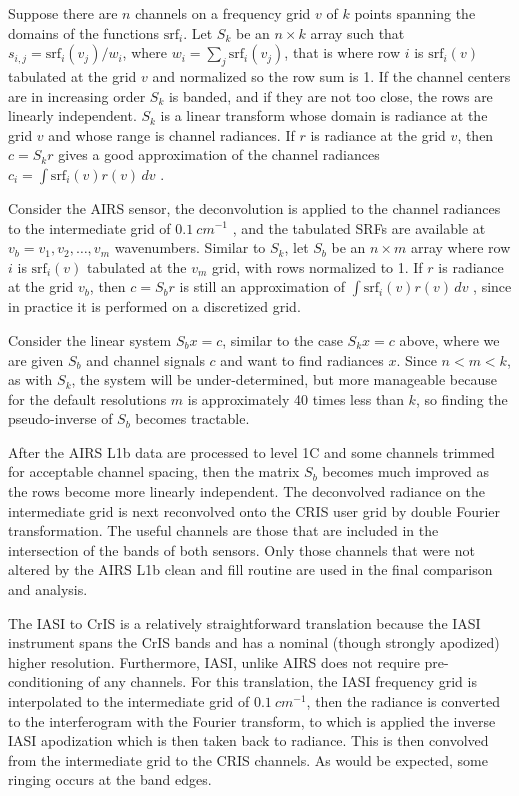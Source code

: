 \documentclass[twocolumn,10pt]{article}
\begin{document}
Suppose there are $n$ channels on a frequency grid $v$ of $k$ points spanning the domains of the functions $\text{srf}_i$. Let $S_k$ be an $n\times k$ array such that $s_{i,j} = \text{srf}_i(v_j)/w_i$, where $w_i = \sum_j \text{srf}_i(v_j)$, that is where row $i$ is $\text{srf}_i(v)$ tabulated at the grid $v$ and normalized so the row sum is 1.  If the channel centers are in increasing order $S_k$ is banded, and if they are not too close,  the rows are linearly independent.  $S_k$ is a linear transform whose domain is radiance at the grid $v$ and whose range is channel radiances.  If $r$ is radiance at the grid $v$, then $c = S_k r$ gives a good approximation of the channel radiances $c_i = \int \text{srf}_i(v)r(v)\,dv$ .

Consider the AIRS sensor, the deconvolution is applied to the channel radiances to the intermediate grid of $0.1\ cm^{-1}$ , and the tabulated SRFs are available at $v_b = v_1,v_2,\ldots,v_m$ wavenumbers.  Similar to $S_k$, let $S_b$ be an $n\times m$ array where row $i$ is $\text{srf}_i(v)$ tabulated at the $v_m$ grid, with rows normalized to 1. If $r$ is radiance at the grid $v_b$, then $c = S_b r$ is still an approximation of $\int \text{srf}_i(v)r(v)\,dv$ , since in practice it is performed on a discretized grid.

Consider the linear system $S_b x = c$, similar to the case $S_k x = c$ above, where we are given $S_b$ and channel signals $c$ and want to find radiances $x$.  Since $n < m < k$, as with $S_k$, the system will be under-determined, but more manageable because for the default resolutions $m$ is approximately 40 times less than $k$, so finding the pseudo-inverse of $S_b$ becomes tractable.

After the AIRS L1b data are processed to level 1C and some channels trimmed for acceptable channel spacing, then the matrix $S_b$ becomes much improved as the rows become more linearly independent. The deconvolved radiance on the intermediate grid is next reconvolved onto the CRIS user grid by double Fourier transformation. The useful channels are those that are included in the intersection of the bands of both sensors.  Only those channels that were not altered by the AIRS L1b clean and fill routine are used in the final comparison and analysis.

The IASI to CrIS is a relatively straightforward translation because the IASI instrument spans the CrIS bands and has a nominal (though strongly apodized) higher resolution. Furthermore, IASI, unlike AIRS does not require pre-conditioning of any channels. For this translation, the IASI frequency grid is interpolated to the intermediate grid of $0.1\ cm^{-1}$, then the radiance is converted to the interferogram with the Fourier transform, to which is applied the inverse IASI apodization which is then taken back to radiance. This is then convolved from the intermediate grid to the CRIS channels. As would be expected, some ringing occurs at the band edges.
\end{document}
